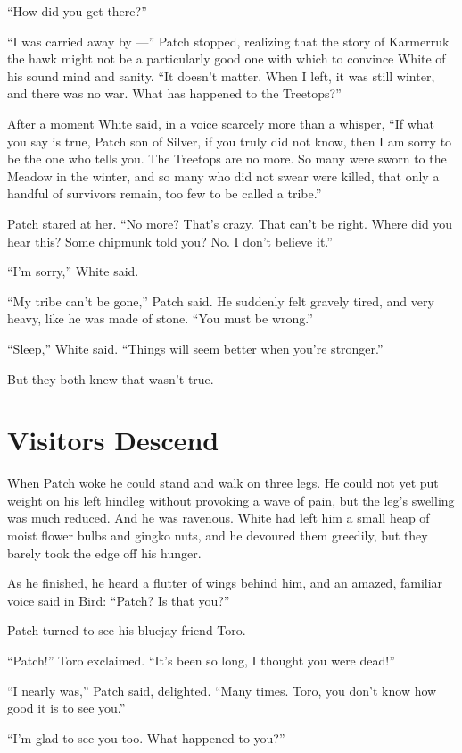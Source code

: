 \documentclass[12pt]{memoir}
\begin{document}
“How did you get there?”

“I was carried away by —” Patch stopped, realizing that the story of
Karmerruk the hawk might not be a particularly good one with which to
convince White of his sound mind and sanity. “It doesn’t matter. When
I left, it was still winter, and there was no war. What has happened
to the Treetops?”

After a moment White said, in a voice scarcely more than a whisper,
“If what you say is true, Patch son of Silver, if you truly did not
know, then I am sorry to be the one who tells you. The Treetops are no
more. So many were sworn to the Meadow in the winter, and so many who
did not swear were killed, that only a handful of survivors remain,
too few to be called a tribe.”

Patch stared at her. “No more? That’s crazy. That can’t be
right. Where did you hear this? Some chipmunk told you? No. I don’t
believe it.”

“I’m sorry,” White said.

“My tribe can’t be gone,” Patch said. He suddenly felt gravely tired,
and very heavy, like he was made of stone. “You must be wrong.”

“Sleep,” White said. “Things will seem better when you’re stronger.”

But they both knew that wasn’t true.


\section{Visitors Descend}

When Patch woke he could stand and walk on three legs. He could not
yet put weight on his left hindleg without provoking a wave of pain,
but the leg’s swelling was much reduced. And he was ravenous. White
had left him a small heap of moist flower bulbs and gingko nuts, and
he devoured them greedily, but they barely took the edge off his
hunger.

As he finished, he heard a flutter of wings behind him, and an amazed,
familiar voice said in Bird: “Patch? Is that you?”

Patch turned to see his bluejay friend Toro.

“Patch!” Toro exclaimed. “It’s been so long, I thought you were dead!”

“I nearly was,” Patch said, delighted. “Many times. Toro, you don’t
know how good it is to see you.”

“I’m glad to see you too. What happened to you?”
\end{document}
